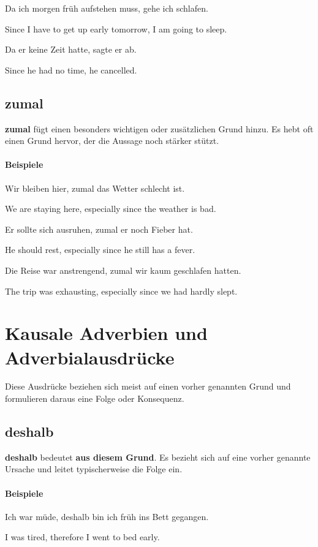 \documentclass[a4paper]{article}
\newcommand{\EN}[1]{\par{\small\textcolor{TranslationGray}{#1}}\vspace{0.25em}}
\begin{document}
        Da ich morgen früh aufstehen muss, gehe ich schlafen.\\
        \EN{Since I have to get up early tomorrow, I am going to sleep.}
        
        Da er keine Zeit hatte, sagte er ab.\\
        \EN{Since he had no time, he cancelled.}
    
    \subsection{zumal}
    \textbf{zumal} fügt einen besonders wichtigen oder zusätzlichen Grund hinzu. Es hebt oft einen Grund hervor, der die Aussage noch stärker stützt.
    
    \paragraph{Beispiele}
        Wir bleiben hier, zumal das Wetter schlecht ist.\\
        \EN{We are staying here, especially since the weather is bad.}
        
        Er sollte sich ausruhen, zumal er noch Fieber hat.\\
        \EN{He should rest, especially since he still has a fever.}
        
        Die Reise war anstrengend, zumal wir kaum geschlafen hatten.\\
        \EN{The trip was exhausting, especially since we had hardly slept.}
    
    
    \section{Kausale Adverbien und Adverbialausdrücke}
    Diese Ausdrücke beziehen sich meist auf einen vorher genannten Grund und formulieren daraus eine Folge oder Konsequenz.
    
    \subsection{deshalb}
        \textbf{deshalb} bedeutet \textbf{aus diesem Grund}. Es bezieht sich auf eine vorher genannte Ursache und leitet typischerweise die Folge ein.
        
        \paragraph{Beispiele}
            Ich war müde, deshalb bin ich früh ins Bett gegangen.\\
            \EN{I was tired, therefore I went to bed early.}
            
\end{document}
